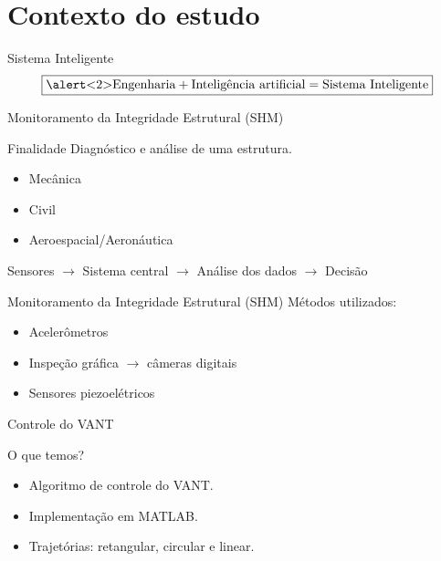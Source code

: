 \section{Contexto do estudo}

\begin{frame}{Sistema Inteligente}
\[\boxed{\text{\alert<2>{Engenharia}} + \text{Inteligência artificial} = \text{Sistema Inteligente}}\]
\end{frame}
\begin{frame}{Monitoramento da Integridade Estrutural (SHM)}
\begin{block}{Finalidade}
    Diagnóstico e análise de uma estrutura.
\end{block} \pause
\vfill
\begin{itemize}
    \item Mecânica
    \item Civil
    \item Aeroespacial/Aeronáutica
\end{itemize} \pause
\vfill
Sensores \(\rightarrow\) Sistema central \(\rightarrow\) Análise dos dados \(\rightarrow\) Decisão
\end{frame}
\begin{frame}{Monitoramento da Integridade Estrutural (SHM)}
Métodos utilizados:
\begin{itemize}
    \item Acelerômetros
    \item Inspeção gráfica \(\rightarrow\) câmeras digitais
    \item \alert<2>{Sensores piezoelétricos}
\end{itemize}
\end{frame}
\begin{frame}{Controle do VANT}
\pause
\begin{block}{O que temos?}
    \begin{itemize}
        \item Algoritmo de controle do VANT.
        \item Implementação em MATLAB.
        \item Trajetórias: retangular, circular e linear.
    \end{itemize}
\end{block} \pause
\vfill
\begin{figure}
    \centering
    
    \end{figure}
\end{frame}

